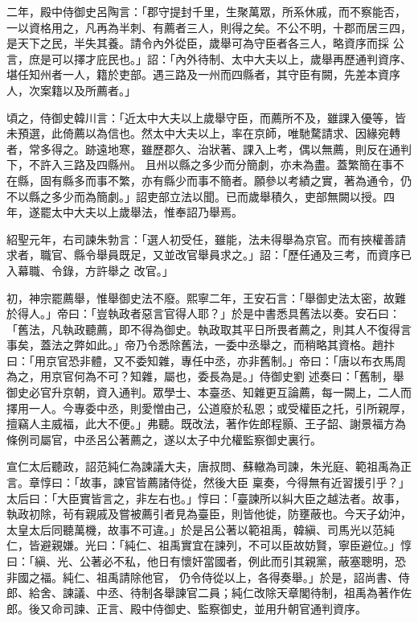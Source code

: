 \begin{pinyinscope}
 二年，殿中侍御史呂陶言：「郡守提封千里，生聚萬眾，所系休戚，而不察能否，一以資格用之，凡再為半刺、有薦者三人，則得之矣。不公不明，十郡而居三四，是天下之民，半失其養。請令內外從臣，歲舉可為守臣者各三人，略資序而採
 公言，庶是可以擇才庇民也。」詔：「內外待制、太中大夫以上，歲舉再歷通判資序、堪任知州者一人，籍於吏部。遇三路及一州而四縣者，其守臣有闕，先差本資序人，次案籍以及所薦者。」



 頃之，侍御史韓川言：「近太中大夫以上歲舉守臣，而薦所不及，雖課入優等，皆未預選，此倚薦以為信也。然太中大夫以上，率在京師，唯馳騖請求、因緣宛轉者，常多得之。跡遠地寒，雖歷郡久、治狀著、課入上考，偶以無薦，則反在通判下，不許入三路及四縣州。
 且州以縣之多少而分簡劇，亦未為盡。蓋繁簡在事不在縣，固有縣多而事不繁，亦有縣少而事不簡者。願參以考績之實，著為通令，仍不以縣之多少而為簡劇。」詔吏部立法以聞。已而歲舉積久，吏部無闕以授。四年，遂罷太中大夫以上歲舉法，惟奉詔乃舉焉。



 紹聖元年，右司諫朱勃言：「選人初受任，雖能，法未得舉為京官。而有挾權善請求者，職官、縣令舉員既足，又並改官舉員求之。」詔：「歷任通及三考，而資序已入幕職、令錄，方許舉之
 改官。」



 初，神宗罷薦舉，惟舉御史法不廢。熙寧二年，王安石言：「舉御史法太密，故難於得人。」帝曰：「豈執政者惡言官得人耶？」於是中書悉具舊法以奏。安石曰：「舊法，凡執政聽薦，即不得為御史。執政取其平日所畏者薦之，則其人不復得言事矣，蓋法之弊如此。」帝乃令悉除舊法，一委中丞舉之，而稍略其資格。趙抃曰：「用京官恐非體，又不委知雜，專任中丞，亦非舊制。」帝曰：「唐以布衣馬周為之，用京官何為不可？知雜，屬也，委長為是。」侍御史劉
 述奏曰：「舊制，舉御史必官升京朝，資入通判。眾學士、本臺丞、知雜更互論薦，每一闕上，二人而擇用一人。今專委中丞，則愛憎由己，公道廢於私恩；或受權臣之托，引所親厚，擅竊人主威福，此大不便。」弗聽。既改法，著作佐郎程顥、王子韶、謝景福方為條例司屬官，中丞呂公著薦之，遂以太子中允權監察御史裏行。



 宣仁太后聽政，詔范純仁為諫議大夫，唐叔問、蘇轍為司諫，朱光庭、範祖禹為正言。章惇曰：「故事，諫官皆薦諸侍從，然後大臣
 稟奏，今得無有近習援引乎？」太后曰：「大臣實皆言之，非左右也。」惇曰：「臺諫所以糾大臣之越法者。故事，執政初除，茍有親戚及嘗被薦引者見為臺臣，則皆他徙，防壅蔽也。今天子幼沖，太皇太后同聽萬機，故事不可違。」於是呂公著以範祖禹，韓縝、司馬光以范純仁，皆避親嫌。光曰：「純仁、祖禹實宜在諫列，不可以臣故妨賢，寧臣避位。」惇曰：「縝、光、公著必不私，他日有懷奸當國者，例此而引其親黨，蔽塞聰明，恐非國之福。純仁、祖禹請除他官，
 仍令侍從以上，各得奏舉。」於是，詔尚書、侍郎、給舍、諫議、中丞、待制各舉諫官二員；純仁改除天章閣待制，祖禹為著作佐郎。後又命司諫、正言、殿中侍御史、監察御史，並用升朝官通判資序。




\end{pinyinscope}
